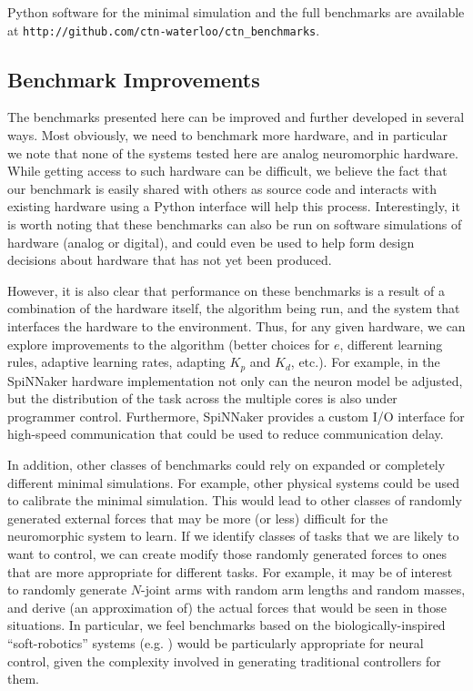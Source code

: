 \documentclass{frontiersSCNS} %
\begin{document}
Python software for the minimal simulation and the full benchmarks are
available at \texttt{http://github.com/ctn-waterloo/ctn\_benchmarks}.

\subsection{Benchmark Improvements}

The benchmarks presented here can be improved and further developed in several
ways.  Most obviously, we need to benchmark more hardware, and in particular
we note that none of the systems tested here are analog neuromorphic hardware.
While getting access to such hardware can be difficult, we believe the fact
that our benchmark is easily shared with others as source code and interacts
with existing hardware using a Python interface will help this process.
Interestingly, it is worth noting that these
benchmarks can also be run on software simulations of hardware (analog or
digital), and could even be used to help form design decisions about hardware
that has not yet been produced.

However, it is also clear that performance on these benchmarks is a result of
a combination of the hardware itself, the algorithm being run, and the system that
interfaces the hardware to the environment.  Thus, for any given hardware, 
we can explore improvements to the algorithm (better choices for $e$, 
different learning rules, adaptive learning rates, adapting $K_p$ and $K_d$, etc.).
For example, in the SpiNNaker hardware implementation not only can the neuron model
be adjusted, but the distribution of the task across the multiple cores is also
under programmer control.  Furthermore, SpiNNaker provides a custom I/O interface
for high-speed communication that could be used to reduce communication delay.

In addition, other classes of benchmarks could rely on expanded or completely
different minimal simulations.  For example, other physical systems could
be used to calibrate the minimal simulation.  This would lead to other classes
of randomly generated external forces that may be more (or less) difficult
for the neuromorphic system to learn.  If we
identify classes of tasks that we are likely to want to control, we can
create modify those randomly generated forces to ones that are more appropriate
for different tasks.  For example, it
may be of interest to randomly generate $N$-joint arms with random arm
lengths and random masses, and derive (an approximation of) the actual forces 
that would be seen in those situations.  In particular, we feel benchmarks
based on the biologically-inspired ``soft-robotics'' systems (e.g. \citealt{Pfeifer2013})
would be particularly appropriate for neural control, given the complexity
involved in generating traditional controllers for them.
\end{document}
